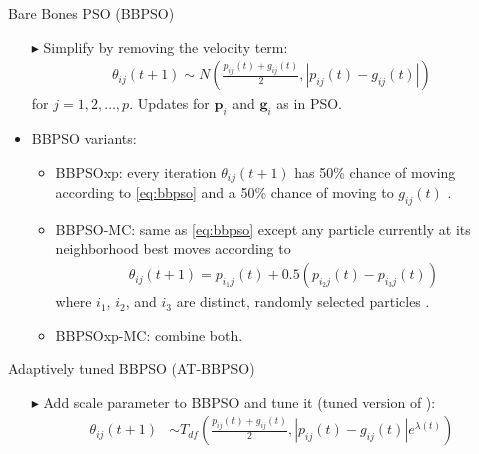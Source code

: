 \documentclass[svgnames, final]{beamer} %
\begin{document}
\begin{frame}{}
\begin{columns}[T]
    \begin{column}{0.32\textwidth}
      \vfill
      \begin{block}{\large Bare Bones PSO (BBPSO) \citep{kennedy2003bare}}
        \begin{itemize}
        \item[$\blacktriangleright$] Simplify by removing the velocity term:
          \begin{align}\label{eq:bbpso}
            \theta_{ij}(t+1) \sim N\left(\frac{p_{ij}(t) + g_{ij}(t)}{2}, |p_{ij}(t) - g_{ij}(t)|\right)
          \end{align}
          for $j=1,2,\dots,p$. Updates for $\bm{p}_i$ and $\bm{g}_i$ as in PSO.
        \end{itemize}
        \vspace{1cm}
        \begin{itemize}
          \setlength{\itemsep0.5em}
        \item BBPSO variants:
          \begin{itemize}
            \setlength{\itemsep0.5em}
          \item BBPSOxp: every iteration $\theta_{ij}(t+1)$ has 50\% chance of moving according to \eqref{eq:bbpso} and a 50\% chance of moving to $g_{ij}(t)$ \citep{kennedy2003bare}.
          \item BBPSO-MC: same as \eqref{eq:bbpso} except any particle currently at its neighborhood best moves according to
            \begin{align*}
              \theta_{ij}(t+1) = p_{i_1j}(t) + 0.5(p_{i_2j}(t) - p_{i_3j}(t))
            \end{align*}
            where $i_1$, $i_2$, and $i_3$ are distinct, randomly selected particles \cite{zhang2011novel}.
          \item BBPSOxp-MC: combine both.
          \end{itemize}
        \end{itemize}
        \vspace{1cm}
      \end{block}
      \vfill
      \begin{block}{\large Adaptively tuned BBPSO (AT-BBPSO)}
        \begin{itemize}
        \item[$\blacktriangleright$] Add scale parameter to BBPSO and tune it (tuned version of \citep{hsieh2010modified}):
          \begin{align*}
            \theta_{ij}(t+1) &\sim T_{df}\left(\frac{p_{ij}(t) + g_{ij}(t)}{2}, |p_{ij}(t) - g_{ij}(t)|e^{\lambda(t)}\right)\\

\end{align*}
\end{itemize}
\end{block}
\end{column}
\end{columns}
\end{frame}
\end{document}
